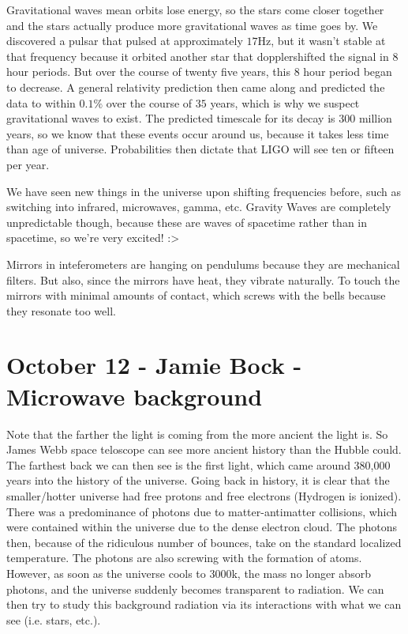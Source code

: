 \documentclass{report}
\begin{document}
Gravitational waves mean orbits lose energy, so the stars come closer together and the stars actually produce more gravitational waves as time goes by. We discovered a pulsar that pulsed at approximately $17$Hz, but it wasn't stable at that frequency because it orbited another star that dopplershifted the signal in $8$ hour periods. But over the course of twenty five years, this $8$ hour period began to decrease. A general relativity prediction then came along and predicted the data to within $0.1\%$ over the course of $35$ years, which is why we suspect gravitational waves to exist. The predicted timescale for its decay is $300$ million years, so we know that these events occur around us, because it takes less time than age of universe. Probabilities then dictate that LIGO will see ten or fifteen per year.

We have seen new things in the universe upon shifting frequencies before, such as switching into infrared, microwaves, gamma, etc. Gravity Waves are completely unpredictable though, because these are waves of spacetime rather than in spacetime, so we're very excited! :> 

Mirrors in inteferometers are hanging on pendulums because they are mechanical filters. But also, since the mirrors have heat, they vibrate naturally. To touch the mirrors with minimal amounts of contact, which screws with the bells because they resonate too well.

\section{October 12 - Jamie Bock - Microwave background}

Note that the farther the light is coming from the more ancient the light is. So James Webb space teloscope can see more ancient history than the Hubble could. The farthest back we can then see is the first light, which came around 380,000 years into the history of the universe. Going back in history, it is clear that the smaller/hotter universe had free protons and free electrons (Hydrogen is ionized). There was a predominance of photons due to matter-antimatter collisions, which were contained within the universe due to the dense electron cloud. The photons then, because of the ridiculous number of bounces, take on the standard localized temperature. The photons are also screwing with the formation of atoms. However, as soon as the universe cools to 3000k, the mass no longer absorb photons, and the universe suddenly becomes transparent to radiation. We can then try to study this background radiation via its interactions with what we can see (i.e. stars, etc.). 
\end{document}

